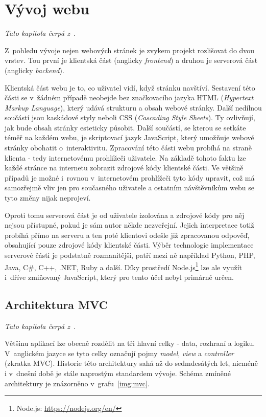 \section{Vývoj webu}
\emph{Tato kapitola čerpá z~\cite{bib:web-development}}.

Z~pohledu vývoje nejen webových stránek je zvykem projekt rozlišovat do dvou vrstev. Tou první je klientská část (anglicky \emph{frontend}) a druhou je serverová část (anglicky \emph{backend}).

Klientská část webu je to, co uživatel vidí, když stránku navštíví. Sestavení této části se v~žádném případě neobejde bez značkovacího jazyka HTML (\emph{Hypertext Markup Language}), který udává strukturu a obsah webové stránky. Další nedílnou součástí jsou kaskádové styly neboli CSS (\emph{Cascading Style Sheets}). Ty ovlivňují, jak bude obsah stránky esteticky působit. Další součástí, se kterou se setkáte téměř na každém webu, je skriptovací jazyk JavaScript, který umožňuje webové stránky obohatit o~interaktivitu.
Zpracování této části webu probíhá na straně klienta - tedy internetovému prohlížeči uživatele. Na základě tohoto faktu lze každé stránce na internetu zobrazit zdrojové kódy klientské části. Ve většině případů je možné i~rovnou v~internetovém prohlížeči tyto kódy upravit, což má samozřejmě vliv jen pro současného uživatele a ostatním návštěvníkům webu se tyto změny nijak neprojeví.

Oproti tomu serverová část je od uživatele izolována a zdrojové kódy pro něj nejsou přístupné, pokud je sám autor někde nezveřejní. Jejich interpretace totiž probíhá přímo na serveru a ten poté klientovi odešle již zpracovanou odpověď, obsahující pouze zdrojové kódy klientské části. Výběr technologie implementace serverové části je podstatně rozmanitější, patří mezi ně například Python, PHP, Java, C\#, C++, .NET, Ruby a další. Díky prostředí Node.js\footnote{Node.js: \url{https://nodejs.org/en/}} lze ale využít i~dříve zmiňovaný JavaScript, který pro tento účel nebyl primárně určen. 


\subsection{Architektura MVC}\label{section:mvc}
\emph{Tato kapitola čerpá z~\cite{bib:mvc}}.

Většinu aplikací lze obecně rozdělit na tři hlavní celky - data, rozhraní a logiku. V~anglickém jazyce se tyto celky označují pojmy \emph{model}, \emph{view} a \emph{controller} (zkratka MVC). Historie této architektury sahá až do sedmdesátých let, nicméně i v~dnešní době je stále naprostým standardem vývoje. Schéma zmíněné architektury je znázorněno v~grafu~\ref{img:mvc}.

